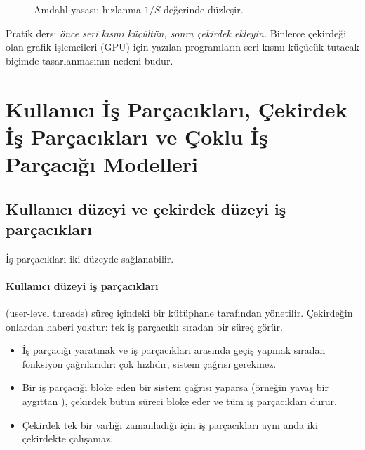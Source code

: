 \begin{figure}[H]
\centering
{}
\caption{Amdahl yasası: hızlanma $1/S$ değerinde düzleşir.}
\end{figure}

Pratik ders: \emph{önce seri kısmı küçültün, sonra çekirdek ekleyin.} Binlerce çekirdeği olan grafik işlemcileri (GPU) için yazılan programların seri kısmı küçücük tutacak biçimde tasarlanmasının nedeni budur.

\section{Kullanıcı İş Parçacıkları, Çekirdek İş Parçacıkları ve Çoklu İş Parçacığı Modelleri}

\subsection{Kullanıcı düzeyi ve çekirdek düzeyi iş parçacıkları}

İş parçacıkları iki düzeyde sağlanabilir.

\paragraph{Kullanıcı düzeyi iş parçacıkları} (user-level threads) süreç içindeki bir kütüphane tarafından yönetilir. Çekirdeğin onlardan haberi yoktur: tek iş parçacıklı sıradan bir süreç görür.
\begin{itemize}
  \item[\textcolor{mintdeep}{$+$}] İş parçacığı yaratmak ve iş parçacıkları arasında geçiş yapmak sıradan fonksiyon çağrılarıdır: çok hızlıdır, sistem çağrısı gerekmez.
  \item[\textcolor{red!60!black}{$-$}] Bir iş parçacığı bloke eden bir sistem çağrısı yaparsa (örneğin yavaş bir aygıttan ), çekirdek bütün süreci bloke eder ve tüm iş parçacıkları durur.
  \item[\textcolor{red!60!black}{$-$}] Çekirdek tek bir varlığı zamanladığı için iş parçacıkları aynı anda iki çekirdekte çalışamaz.
\end{itemize}

